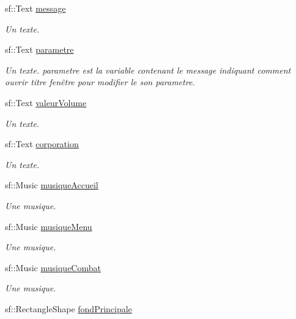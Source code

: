 \begin{DoxyCompactItemize}
sf\+::\+Text \hyperlink{class_s_f_m_l_menu_a033a42111a787bd3a7ed6d4d80c91549}{message}
\begin{DoxyCompactList}\small\item\em Un texte. \end{DoxyCompactList}\item 
\mbox{\label{class_s_f_m_l_menu_aebf86410da0db7889e4407f9fb54acf0}} 
sf\+::\+Text \hyperlink{class_s_f_m_l_menu_aebf86410da0db7889e4407f9fb54acf0}{parametre}
\begin{DoxyCompactList}\small\item\em Un texte. parametre est la variable contenant le message indiquant comment ouvrir titre fenêtre pour modifier le son parametre. \end{DoxyCompactList}\item 
sf\+::\+Text \hyperlink{class_s_f_m_l_menu_a3c651e4b2621b63100ac8fa314c914c6}{valeur\+Volume}
\begin{DoxyCompactList}\small\item\em Un texte. \end{DoxyCompactList}\item 
sf\+::\+Text \hyperlink{class_s_f_m_l_menu_ab363a837f8b4f25245e873cd8e87f840}{corporation}
\begin{DoxyCompactList}\small\item\em Un texte. \end{DoxyCompactList}\item 
sf\+::\+Music \hyperlink{class_s_f_m_l_menu_a5aebf65ce7c0123958599f7548498d7c}{musique\+Accueil}
\begin{DoxyCompactList}\small\item\em Une musique. \end{DoxyCompactList}\item 
sf\+::\+Music \hyperlink{class_s_f_m_l_menu_abd6e2853990633fea892fced6bdf60d8}{musique\+Menu}
\begin{DoxyCompactList}\small\item\em Une musique. \end{DoxyCompactList}\item 
sf\+::\+Music \hyperlink{class_s_f_m_l_menu_aa14d92454f208cac3d46c1241f9ca957}{musique\+Combat}
\begin{DoxyCompactList}\small\item\em Une musique. \end{DoxyCompactList}\item 
sf\+::\+Rectangle\+Shape \hyperlink{class_s_f_m_l_menu_a233057a68d8e183daff723e7ccd33077}{fond\+Principale}

\end{DoxyCompactItemize}
